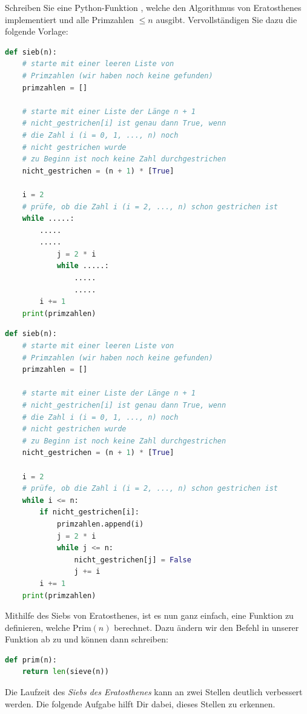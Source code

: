 	\begin{myexercise}\label{myexercise:sieb}
		Schreiben Sie eine Python-Funktion , welche den Algorithmus von Eratosthenes implementiert und alle Primzahlen $\leq n$ ausgibt. Vervollständigen Sie dazu die folgende Vorlage:
		\begin{lstlisting}[language=Python,caption=Sieb des Eratosthenes,numbers=none]
def sieb(n):
    # starte mit einer leeren Liste von
    # Primzahlen (wir haben noch keine gefunden)
    primzahlen = []

    # starte mit einer Liste der Länge n + 1
    # nicht_gestrichen[i] ist genau dann True, wenn
    # die Zahl i (i = 0, 1, ..., n) noch
    # nicht gestrichen wurde
    # zu Beginn ist noch keine Zahl durchgestrichen
    nicht_gestrichen = (n + 1) * [True]

    i = 2
    # prüfe, ob die Zahl i (i = 2, ..., n) schon gestrichen ist
    while .....:
        .....
        .....
            j = 2 * i
            while .....:
                .....
                .....
        i += 1
    print(primzahlen)
\end{lstlisting}
		\begin{myanswer}
			\begin{lstlisting}[language=Python,caption=Sieb des Eratosthenes,numbers=none]
def sieb(n):
    # starte mit einer leeren Liste von
    # Primzahlen (wir haben noch keine gefunden)
    primzahlen = []

    # starte mit einer Liste der Länge n + 1
    # nicht_gestrichen[i] ist genau dann True, wenn
    # die Zahl i (i = 0, 1, ..., n) noch
    # nicht gestrichen wurde
    # zu Beginn ist noch keine Zahl durchgestrichen
    nicht_gestrichen = (n + 1) * [True]

    i = 2
    # prüfe, ob die Zahl i (i = 2, ..., n) schon gestrichen ist
    while i <= n:
        if nicht_gestrichen[i]:
            primzahlen.append(i)
            j = 2 * i
            while j <= n:
                nicht_gestrichen[j] = False
                j += i
        i += 1
    print(primzahlen)
\end{lstlisting}
		\end{myanswer}
	\end{myexercise}

	Mithilfe des Siebs von Eratosthenes, ist es nun ganz einfach, eine Funktion zu definieren, welche $\text{Prim}(n)$ berechnet. Dazu ändern wir den Befehl  in unserer Funktion  ab zu  und können dann schreiben:
	\begin{lstlisting}[language=Python,caption=Prim,numbers=none]
def prim(n):
    return len(sieve(n))
\end{lstlisting}
	Die Laufzeit des \textit{Siebs des Eratosthenes} kann an zwei Stellen deutlich verbessert werden. Die folgende Aufgabe hilft Dir dabei, dieses Stellen zu erkennen.

